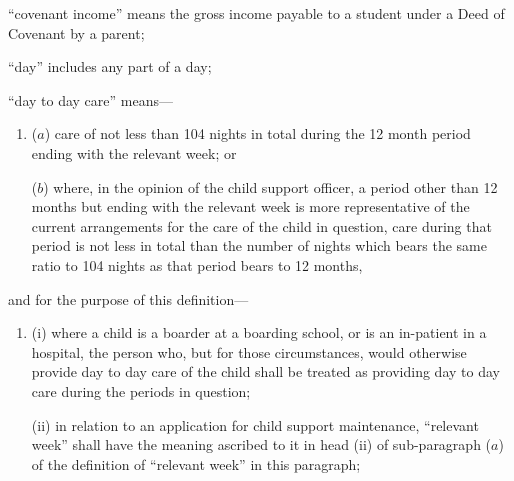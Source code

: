 \documentclass[12pt,a4paper]{article}
\begin{document}
\begin{enumerate}
“covenant income” means the gross income payable to a student under a Deed of Covenant by a parent;

“day” includes any part of a day;

%

“day to day care” means—
\begin{enumerate}\item[]
($a$) care of not less than 104 nights in total during the 12 month period ending with the relevant week; or

($b$) where, in the opinion of the child support officer, a period other than 12 months but ending with the relevant week is more representative of the current arrangements for the care of the child in question, care during that period is not less in total than the number of nights which bears the same ratio to 104 nights as that period bears to 12 months,
\end{enumerate}
and for the purpose of this definition—
\begin{enumerate}\item[]
(i) where a child is a boarder at a boarding school, or is an in-patient in a hospital, the person who, but for those circumstances, would otherwise provide day to day care of the child shall be treated as providing day to day care during the periods in question;


(ii) in relation to an application for child support maintenance, “relevant week” shall have the meaning ascribed to it in head (ii) of sub-paragraph ($a$) of the definition of “relevant week” in this paragraph;


\end{enumerate}
\end{enumerate}
\end{document}

